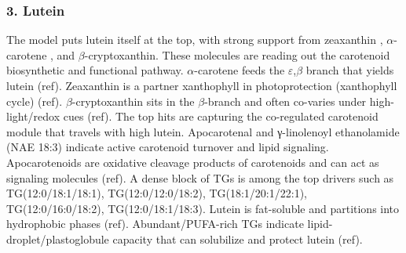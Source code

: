 \documentclass[10pt,letterpaper]{article}
\begin{document}
\begin{itemize}



\subsubsection*{3. Lutein} 
The model puts lutein itself at the top, with strong support from zeaxanthin , $\alpha$-carotene , and $\beta$-cryptoxanthin. These molecules are reading out the carotenoid biosynthetic and functional pathway. $\alpha$-carotene feeds the $\varepsilon$,$\beta$ branch that yields lutein (ref). Zeaxanthin is a partner xanthophyll in photoprotection (xanthophyll cycle) (ref). $\beta$-cryptoxanthin sits in the $\beta$-branch and often co-varies under high-light/redox cues (ref). The top hits are capturing the co-regulated carotenoid module that travels with high lutein.
Apocarotenal and γ-linolenoyl ethanolamide (NAE 18:3) indicate active carotenoid turnover and lipid signaling. Apocarotenoids are oxidative cleavage products of carotenoids and can act as signaling molecules (ref).
A dense block of TGs is among the top drivers such as TG(12:0/18:1/18:1), TG(12:0/12:0/18:2), TG(18:1/20:1/22:1), TG(12:0/16:0/18:2), TG(12:0/18:1/18:3). Lutein is fat-soluble and partitions into hydrophobic phases (ref). Abundant/PUFA-rich TGs indicate lipid-droplet/plastoglobule capacity that can solubilize and protect lutein (ref).




\end{itemize}
\end{document}
